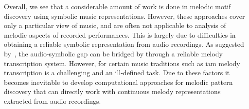 Overall, we see that a considerable amount of work is done in melodic motif discovery using symbolic music representations. However, these approaches cover only a particular view of music, and are often not applicable to analysis of melodic aspects of recorded performances. This is largely due to difficulties in obtaining a reliable symbolic representation from audio recordings. As suggested by~\cite{collins2014bridging}, the audio-symbolic gap can be bridged by through a reliable melody transcription system. However, for certain music traditions such as \gls{iam} melody transcription is a challenging and an ill-defined task. Due to these factors it becomes inevitable to develop computational approaches for melodic pattern discovery that can directly work with continuous melody representations extracted from audio recordings.


%
%


%
%
%

